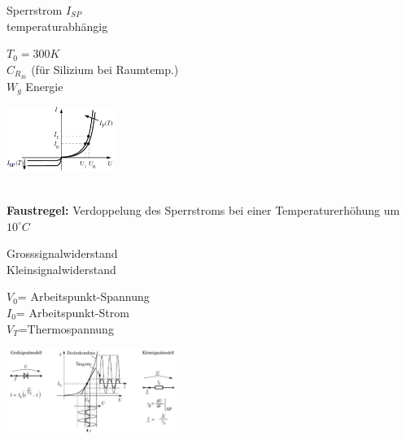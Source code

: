   \begin{minipage}[T]{9.5cm}
    Sperrstrom $I_{SP}$
    \hspace{18mm}\\
    temperaturabh\"angig
    \hspace{11mm}\\
  \end{minipage}
  \begin{minipage}{6cm}
    $T_0 = 300K$\\
    $C_{R_{Si}}$ (f\"ur Silizium bei Raumtemp.)\\
    $W_g$ Energie
  \end{minipage}
  \begin{minipage}{3.5cm}
    \includegraphics[width=3.5cm]{./bilder/IspKennlinieDiodeTemp}\\
  \end{minipage}\\
  {\bf Faustregel:} Verdoppelung des Sperrstroms bei einer Temperaturerh\"ohung um $10 ^\circ C$
            
  \begin{minipage}[T]{8.5cm}
    Grosssignalwiderstand
    \hspace{8mm}\\
    Kleinsignalwiderstand
    \hspace{8.4mm}\\
  \end{minipage}
  \begin{minipage}{5cm}
    $V_0$= Arbeitspunkt-Spannung\\
    $I_0$= Arbeitspunkt-Strom\\
    $V_T$=Thermospannung
  \end{minipage}
  \begin{minipage}{5.5cm}
    \includegraphics[width=5.5cm]{./bilder/GrossKleinSig}\\
  \end{minipage}
  
